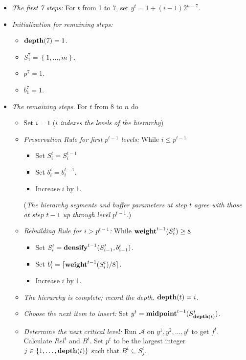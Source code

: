 \documentclass[unicode,review]{siamart1116}
\newcommand{\A}{\mathcal{A}}
\newcommand{\natInt}[2]{ \left\{ #1, \dotsc, #2 \right\} }
\newcommand{\weight}{{\rm {\bf weight}}}
\newcommand{\midp}{{\rm {\bf midpoint}}}
\newcommand{\depth}{{\rm {\bf depth}}}
\newcommand{\densify}{{\rm {\bf densify}}}
\numberwithin{theorem}{section}
\begin{document}
\begin{itemize}
\iffalse
\smallskip\noindent Set $p^0=0$.
\fi
\item  \emph{The first 7 steps:} For $t$ from 1 to 7, set $y^t= 1+ (i-1)2^{n-7}$.

\item \emph{Initialization for remaining steps:}
\begin{itemize}
\item $\depth(7)=1$.
\item $S^7_1=\natInt{1}{m}$.
\item $p^7=1$.
\item $b^7_1=1$.
\end{itemize}
\item \emph{The remaining steps.} For $t$ from 8 to $n$ do
\begin{itemize}
\item
Set $i=1$ (\emph{$i$ indexes the levels of the hierarchy})
\item
\emph{Preservation Rule for first $p^{t-1}$ levels:} While $i \leq p^{t-1}$ 
\begin{itemize}
\item Set $S^t_i=S^{t-1}_{i}$ 
\item Set $b^t_i=b^{t-1}_i$.  
\item Increase $i$ by 1.
\end{itemize}
(\emph{The hierarchy segments and buffer parameters at step $t$ agree with those at step $t-1$ up through level $p^{t-1}$.})
\item
\emph{Rebuilding Rule for $i>p^{t-1}$:} While $\weight^{t-1}(S^t_{i}) \ge 8$
\begin{itemize}
\item Set $S^t_i = \densify^{t-1}(S^t_{i-1},b^t_{i-1})$.
\item Set $b^t_i = \lceil \weight^{t-1}(S^t_i)/8 \rceil$.
\item Increase $i$ by 1.
\end{itemize}
\item \emph{The hierarchy is complete; record the depth.}
 $\depth(t)=i$.
\item \emph{Choose the next item to insert:}
Set $y^t = \midp^{t-1}(S^t_{\depth(t)})$.
\item
\emph{Determine the next critical level:}
Run $\A$ on $y^1,y^2,\dotsc,y^t$ to get $f^t$. Calculate $Rel^t$ and $B^t$.
Set $p^{t}$ to be the largest integer $j \in \natInt{1}{\depth(t)}$ such that $B^{t} \subseteq S^{t}_j$.
\end{itemize}
\end{itemize}
\end{document}
